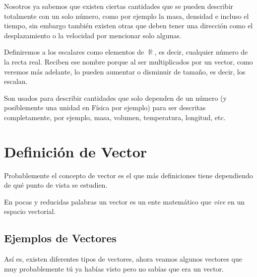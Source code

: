 \documentclass[12pt, fleqn]{report}                             %
\theoremstyle{break}                                            %
\DeclareMathOperator \Reals        {\mathbb{R}}                 %
\begin{document}
            Nosotros ya sabemos que existen ciertas cantidades que se pueden describir
            totalmente con un solo número, como por ejemplo la masa, densidad
            e incluso el tiempo, sin embargo también existen otras que deben tener una
            dirección como el desplazamiento o la velocidad por mencionar solo algunas.

            Definiremos a los escalares como elementos de $\Reals$, es decir, cualquier número de
            la recta real.
            Reciben ese nombre porque al ser multiplicados por un vector, como veremos más adelante,
            lo pueden aumentar o disminuir de tamaño, es decir, los escalan.

            Son usados para describir cantidades que solo dependen de un número (y posiblemente una
            unidad en Física por ejemplo) para ser descritas completamente, por ejemplo, masa,
            volumen, temperatura, longitud, etc.


        \vspace{1em}
        \section{Definición de Vector}
        
            Probablemente el concepto de vector es el que más definiciones tiene dependiendo de qué
            punto de vista se estudien.

            En pocas y reducidas palabras un vector es un ente matem\'atico que \textsl{vive} 
            en un espacio vectorial. 

            \subsection{Ejemplos de Vectores}
                Así es, existen diferentes tipos de vectores, ahora veamos algunos 
                vectores que muy probablemente tú ya habías visto pero no sabías
                que era un vector.
\end{document}
